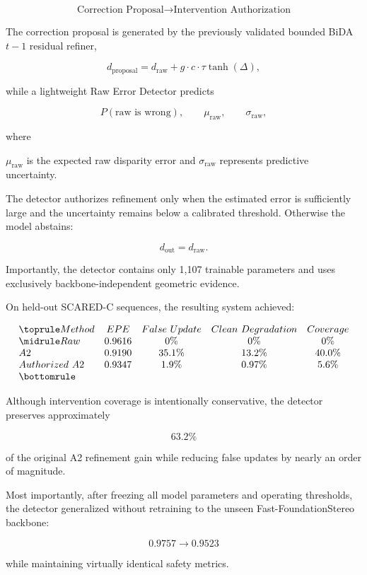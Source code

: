 \documentclass[11pt,a4paper]{article}
\begin{document}
\[
\boxed{
\text{Correction Proposal}
\rightarrow
\text{Intervention Authorization}
}
\]

The correction proposal is generated by the previously validated bounded BiDA \(t-1\) residual refiner,

\[
d_{\mathrm{proposal}}
=
d_{\mathrm{raw}}
+
g
\cdot
c
\cdot
\tau
\tanh(\Delta),
\]

while a lightweight Raw Error Detector predicts

\[
P(\text{raw is wrong}),
\qquad
\mu_{\mathrm{raw}},
\qquad
\sigma_{\mathrm{raw}},
\]

where

\(\mu_{\mathrm{raw}}\) is the expected raw disparity error and
\(\sigma_{\mathrm{raw}}\) represents predictive uncertainty.

The detector authorizes refinement only when the estimated error is sufficiently large and the uncertainty remains below a calibrated threshold. Otherwise the model abstains:

\[
d_{\mathrm{out}}
=
d_{\mathrm{raw}}.
\]

Importantly, the detector contains only 1,107 trainable parameters and uses exclusively backbone-independent geometric evidence.

On held-out SCARED-C sequences, the resulting system achieved:

\[
\begin{array}{lcccc}
\toprule
Method &
EPE &
False\ Update &
Clean\ Degradation &
Coverage\\
\midrule
Raw &
0.9616 &
0\% &
0\% &
0\%\\
A2 &
0.9190 &
35.1\% &
13.2\% &
40.0\%\\
Authorized\ A2 &
0.9347 &
1.9\% &
0.97\% &
5.6\%\\
\bottomrule
\end{array}
\]

Although intervention coverage is intentionally conservative, the detector preserves approximately

\[
63.2\%
\]

of the original A2 refinement gain while reducing false updates by nearly an order of magnitude.

Most importantly, after freezing all model parameters and operating thresholds, the detector generalized without retraining to the unseen Fast-FoundationStereo backbone:

\[
0.9757
\rightarrow
0.9523
\]

while maintaining virtually identical safety metrics.
\end{document}
